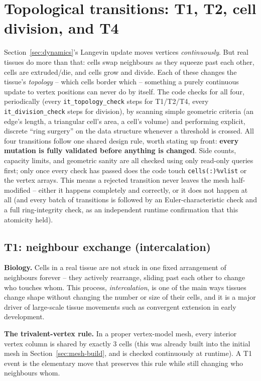 \documentclass[11pt,a4paper]{report}
\begin{document}
\section{Topological transitions: T1, T2, cell division, and T4}
\label{sec:transitions}

Section~\ref{sec:dynamics}'s Langevin update moves vertices
\emph{continuously}. But real tissues do more than that: cells swap
neighbours as they squeeze past each other, cells are extruded/die, and
cells grow and divide. Each of these changes the tissue's
\emph{topology} -- which cells border which -- something a purely
continuous update to vertex positions can never do by itself. The code
checks for all four, periodically (every \texttt{it\_topology\_check}
steps for T1/T2/T4, every \texttt{it\_division\_check} steps for
division), by scanning simple geometric criteria (an edge's length, a
triangular cell's area, a cell's volume) and performing explicit,
discrete ``ring surgery'' on the data structure whenever a threshold is
crossed. All four transitions follow one shared design rule, worth
stating up front: \textbf{every mutation is fully validated before
anything is changed}. Side counts, capacity limits, and geometric
sanity are all checked using only read-only queries first; only once
every check has passed does the code touch \texttt{cells(:)\%vlist} or
the vertex arrays. This means a rejected transition never leaves the
mesh half-modified -- either it happens completely and correctly, or it
does not happen at all (and every batch of transitions is followed by
an Euler-characteristic check and a full ring-integrity check, as an
independent runtime confirmation that this atomicity held).

\subsection{T1: neighbour exchange (intercalation)}
\label{sec:T1}
\textbf{Biology.} Cells in a real tissue are not stuck in one fixed
arrangement of neighbours forever -- they actively rearrange, sliding
past each other to change who touches whom. This process,
\emph{intercalation}, is one of the main ways tissues change shape
without changing the number or size of their cells, and it is a major
driver of large-scale tissue movements such as convergent extension in
early development.

\textbf{The trivalent-vertex rule.} In a proper vertex-model mesh,
every interior vertex column is shared by exactly 3 cells (this was
already built into the initial mesh in Section~\ref{sec:mesh-build},
and is checked continuously at runtime). A T1 event is the elementary
move that preserves this rule while still changing who neighbours whom.
\end{document}
